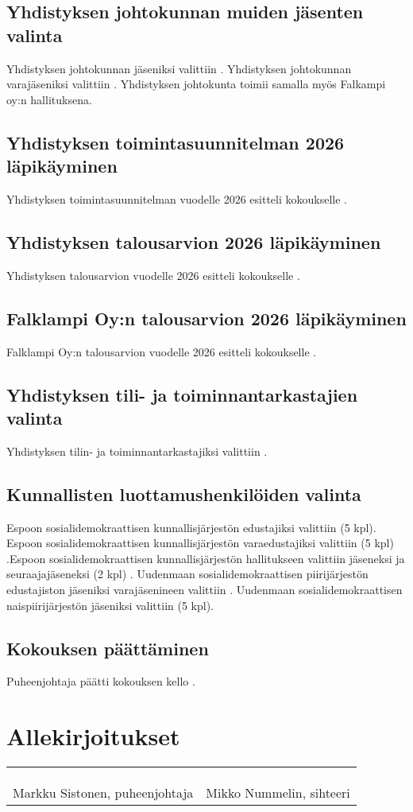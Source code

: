 \documentclass[a4paper,12pt]{article}
\begin{document}
\subsection{Yhdistyksen johtokunnan muiden jäsenten valinta}
Yhdistyksen johtokunnan jäseniksi valittiin . Yhdistyksen johtokunnan varajäseniksi valittiin . Yhdistyksen johtokunta toimii samalla myös Falkampi oy:n hallituksena.
\subsection{Yhdistyksen toimintasuunnitelman 2026 läpikäyminen}
Yhdistyksen toimintasuunnitelman vuodelle 2026 esitteli kokoukselle .
\subsection{Yhdistyksen talousarvion 2026 läpikäyminen}
Yhdistyksen talousarvion vuodelle 2026 esitteli kokoukselle .
\subsection{Falklampi Oy:n talousarvion 2026 läpikäyminen}
Falklampi Oy:n talousarvion vuodelle 2026 esitteli kokoukselle .
\subsection{Yhdistyksen tili- ja toiminnantarkastajien valinta}
Yhdistyksen tilin- ja toiminnantarkastajiksi valittiin .
\subsection{Kunnallisten luottamushenkilöiden valinta}
Espoon sosialidemokraattisen kunnallisjärjestön edustajiksi valittiin (5 kpl). Espoon sosialidemokraattisen kunnallisjärjestön varaedustajiksi valittiin (5 kpl) .Espoon sosialidemokraattisen kunnallisjärjestön hallitukseen valittiin jäseneksi ja seuraajajäseneksi (2 kpl) . Uudenmaan sosialidemokraattisen piirijärjestön edustajiston jäseniksi varajäsenineen valittiin . Uudenmaan sosialidemokraattisen naispiirijärjestön jäseniksi valittiin (5 kpl).
\subsection{Kokouksen päättäminen}
Puheenjohtaja päätti kokouksen kello .
\section*{Allekirjoitukset}
\begin{flushleft}
\begin{tabular}{ll}
& \\
& \\
& \\
Markku Sistonen, puheenjohtaja &
Mikko Nummelin, sihteeri %
\end{tabular}
\end{flushleft}
\end{document}
